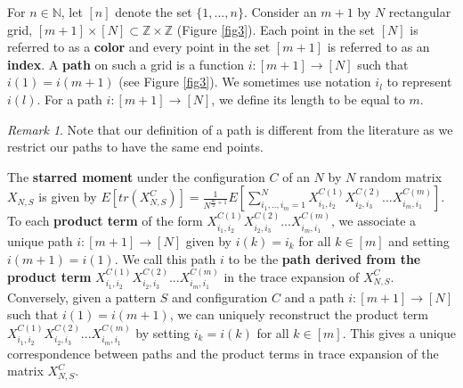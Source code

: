 \documentclass[12pt]{amsart}
\theoremstyle{definition}
\theoremstyle{remark}
\newtheorem{remark}{Remark}
\newcommand\red{\color{red}}
\begin{document}
For $n \in \mathbb{N}$, let $[n]$ denote the set $\{1,...,n\}$. Consider an $m+1$ by $N$ rectangular grid, $[m+1] \times [N] \subset \mathbb{Z} \times \mathbb{Z}$ (Figure \ref{fig3}). Each point in the set $[N]$ is referred to as a \textbf{color} and every point in the set $[m+1]$ is referred to as an \textbf{index}. A \textbf{path} on such a grid is a function $i: [m+1] \to [N]$ such that $i(1)=i(m+1)$ (see Figure \ref{fig3}). We sometimes use notation $i_l$ to represent $i(l)$. For a path $i:[m+1] \to [N]$, we define its length to be equal to $m$.

\begin{remark}
Note that our definition of a path is different from the literature as we restrict our paths to have the same end points.
\end{remark}





The \textbf{starred moment} under the configuration $C$ of an $N$ by $N$ random matrix $X_{N,S}$ is given by $E[tr(X_{N,S}^C)] = \frac{1}{N^{\frac{m}{2}+1}}
E[\sum_{i_1,..,i_m=1}^NX_{i_1,i_2}^{C(1)}X_{i_2,i_3}^{C(2)}...X_{i_{m},i_{1}}^{C(m)}]$.  To each \textbf{product term} of the form $X_{i_1,i_2}^{C(1)}X_{i_2,i_3}^{C(2)}...X_{i_{m},i_{1}}^{C(m)}$, we associate a unique path $i:[m+1] \to [N]$  given by $i(k)=i_k$ for all $k \in [m]$ and setting $i(m+1)=i(1)$. We call this path $i$ to be the \textbf{path derived from the product term} $X_{i_1,i_2}^{C(1)}X_{i_2,i_3}^{C(2)}...X_{i_{m},i_{1}}^{C(m)}$ in the
trace expansion of $X_{N,S}^C$. Conversely, given a pattern $S$ and configuration $C$ and a path $i: [m+1] \to [N]$ such that $i(1)=i(m+1)$, we can uniquely reconstruct the product term $X_{i_1,i_2}^{C(1)}X_{i_2,i_3}^{C(2)}...X_{i_{m},i_{1}}^{C(m)}$ by setting $i_k=i(k)$ for all $k \in [m]$. This gives a unique correspondence between paths and the product terms in trace expansion of the matrix $X_{N,S}^C$. 
\\
\end{document}
